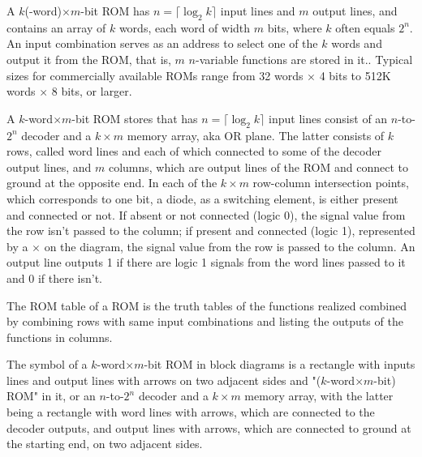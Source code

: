\documentclass[a4paper,12pt]{report}
\begin{document}
A $k$(-word)$\times m$-bit ROM has $n=\lceil\log_2k\rceil$ input lines and $m$ output lines, and contains an array of $k$ words, each word of width $m$ bits, where $k$ often equals $2^n$. An input combination serves as an address to select one of the $k$ words and output it from the ROM, that is, $m$ $n$-variable functions are stored in it.. Typical sizes for commercially available ROMs range from 32 words $\times$ 4 bits to 512K words $\times$ 8 bits, or larger.

A $k$-word$\times m$-bit ROM stores that has $n=\lceil\log_2k\rceil$ input lines consist of an $n$-to-$2^n$ decoder and a $k\times m$ memory array, aka OR plane. The latter consists of $k$ rows, called word lines and each of which connected to some of the decoder output lines, and $m$ columns, which are output lines of the ROM and connect to ground at the opposite end. In each of the $k\times m$ row-column intersection points, which corresponds to one bit, a diode, as a switching element, is either present and connected or not. If absent or not connected (logic 0), the signal value from the row isn't passed to the column; if present and connected (logic 1), represented by a $\times$ on the diagram, the signal value from the row is passed to the column. An output line outputs 1 if there are logic 1 signals from the word lines passed to it and 0 if there isn't.

The ROM table of a ROM is the truth tables of the functions realized combined by combining rows with same input combinations and listing the outputs of the functions in columns.

The symbol of a $k$-word$\times m$-bit ROM in block diagrams is a rectangle with inputs lines and output lines with arrows on two adjacent sides and "($k$-word$\times m$-bit) ROM" in it, or an $n$-to-$2^n$ decoder and a $k\times m$ memory array, with the latter being a rectangle with word lines with arrows, which are connected to the decoder outputs, and output lines with arrows, which are connected to ground at the starting end, on two adjacent sides.
\end{document}

